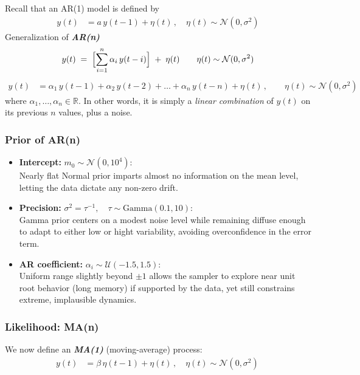 \documentclass{Configuration_Files/PoliMi3i_thesis}
\begin{document}
Recall that an AR(1) model is defined by
\begin{align}
y(t) &= a\,y(t-1) + \eta(t)\,, 
\quad \eta(t)\sim\mathcal{N}(0,\sigma^2)
\end{align}
Generalization of \textbf{\textit{AR(n)}}
\[
y(t) \;=\; \Bigl[\sum_{i=1}^{n}\alpha_i\,y(t-i)\Bigr]\;+\;\eta(t)
\qquad
\eta(t)\sim\mathcal{N}(0,\sigma^2)
\]
\begin{align}
y(t)
&=
\alpha_{1}\,y(t-1)
+ \alpha_{2}\,y(t-2)
+ \dots
+ \alpha_{n}\,y(t-n)
+ \eta(t)\,, 
\qquad
\eta(t)\sim\mathcal{N}(0,\sigma^2)
\end{align}
where $\alpha_{1},\dots,\alpha_{n}\in\mathbb{R}$.  In other words, it is simply a \emph{linear combination} of \(y(t)\) on its previous $n$ values, plus a noise.

\subsubsection{Prior of AR(n)}
\begin{itemize}
    \item \textbf{Intercept:} $m_0 \sim \mathcal{N}(0,10^4)$:\\
    Nearly flat Normal prior imparts almost no information on the mean level, letting the data dictate any non-zero drift.
    \item \textbf{Precision:} $\sigma^2 = \tau^{-1}, \quad \tau \sim \mathrm{Gamma}(0.1, 10)$:\\
    Gamma prior centers on a modest noise level while remaining diffuse enough to adapt to either low or hight variability, avoiding overconfidence in the error term. 
    \item \textbf{AR coefficient:} $\alpha_i \sim \mathcal{U}(-1.5,1.5)$:\\
    Uniform range slightly beyond $\pm 1$ allows the sampler to explore near unit root behavior (long memory) if supported by the data, yet still constrains extreme, implausible dynamics.
\end{itemize}


\subsubsection{Likelihood: MA(n)} 
We now define an \textbf{\textit{MA(1)}} (moving-average) process:
\begin{align}
y(t) &= \beta\,\eta(t-1) + \eta(t)\,, 
\quad \eta(t)\sim\mathcal{N}(0,\sigma^2)\,
\end{align}
\end{document}
